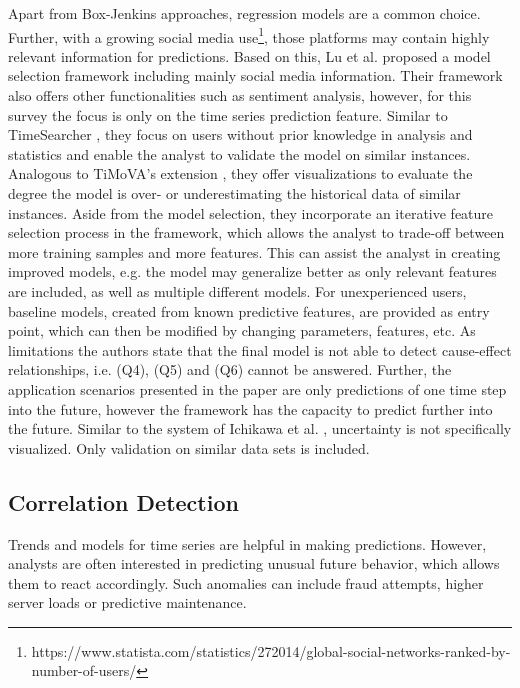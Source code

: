 \documentclass[electronic]{vgtc}             %
\begin{document}
Apart from Box-Jenkins approaches, regression models are a common choice. 
Further, with a growing social media use\footnote{https://www.statista.com/statistics/272014/global-social-networks-ranked-by-number-of-users/}, those platforms may contain highly relevant information for predictions. 
Based on this, Lu et al. \cite{lu:2014} proposed a model selection framework including mainly social media information. 
Their framework also offers other functionalities such as sentiment analysis, however, for this survey the focus is only on the time series prediction feature.
Similar to TimeSearcher \cite{Hochheiser:2004, buono:2005, buono:2007}, they focus on users without prior knowledge in analysis and statistics and enable the analyst to validate the model on similar instances. 
Analogous to TiMoVA's extension \cite{boegl:2014}, they offer visualizations to evaluate the degree the model is over- or underestimating the historical data of similar instances.
Aside from the model selection, they incorporate an iterative feature selection process in the framework, which allows the analyst to trade-off between more training samples and more features. 
This can assist the analyst in creating improved models, e.g. the model may generalize better as only relevant features are included, as well as multiple different models. 
For unexperienced users, baseline models, created from known predictive features, are provided as entry point, which can then be modified by changing parameters, features, etc.
As limitations the authors state that the final model is not able to detect cause-effect relationships, i.e. (Q4), (Q5) and (Q6) cannot be answered. 
Further, the application scenarios presented in the paper are only predictions of one time step into the future, however the framework has the capacity to predict further into the future.
Similar to the system of Ichikawa et al. \cite{ichikawa:2002}, uncertainty is not specifically visualized.
Only validation on similar data sets is included.


\subsection{Correlation Detection\label{subsec:correlation}}
Trends and models for time series are helpful in making predictions.  
However, analysts are often interested in predicting unusual future behavior, which allows them to react accordingly. 
Such anomalies can include fraud attempts, higher server loads or predictive maintenance.
\end{document}
